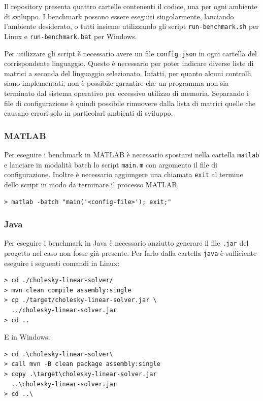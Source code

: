 \documentclass[a4paper, 12pt]{article}
\begin{document}
Il repository presenta quattro cartelle contenenti il codice, una per ogni
ambiente di sviluppo.
I benchmark possono essere eseguiti singolarmente, lanciando l'ambiente
desiderato, o tutti insieme utilizzando gli script \texttt{run-benchmark.sh}
per Linux e \texttt{run-benchmark.bat} per Windows.

Per utilizzare gli script è necessario avere un file \texttt{config.json} in
ogni cartella del corrispondente linguaggio.
Questo è necessario per poter indicare diverse liste di matrici a seconda del
linguaggio selezionato. Infatti, per quanto alcuni controlli siano implementati,
non è possibile garantire che un programma non sia terminato dal sistema
operativo per eccessivo utilizzo di memoria. Separando i file di configurazione
è quindi possibile rimuovere dalla lista di matrici quelle che causano errori
solo in particolari ambienti di sviluppo.

\subsubsection{MATLAB}
Per eseguire i benchmark in MATLAB è necessario spostarsi nella cartella
\texttt{matlab} e lanciare in modalità batch lo script \texttt{main.m} con
argomento il file di configurazione. Inoltre è necessario aggiungere una
chiamata \texttt{exit} al termine dello script in modo da terminare il processo
MATLAB.
\begin{lstlisting}[frame=single]
> matlab -batch "main('<config-file>'); exit;"
\end{lstlisting}

\subsubsection{Java}
Per eseguire i benchmark in Java è necessario anziutto generare il file 
\texttt{.jar} del progetto nel caso non fosse già presente. Per farlo dalla 
cartella \texttt{java} è sufficiente eseguire i seguenti comandi in Linux:
\begin{lstlisting}[frame=single]
> cd ./cholesky-linear-solver/
> mvn clean compile assembly:single
> cp ./target/cholesky-linear-solver.jar \
  ../cholesky-linear-solver.jar
> cd ..
\end{lstlisting}

E in Windows:
\begin{lstlisting}[frame=single]
> cd .\cholesky-linear-solver\
> call mvn -B clean package assembly:single
> copy .\target\cholesky-linear-solver.jar 
  ..\cholesky-linear-solver.jar
> cd ..\
\end{lstlisting}
\end{document}
